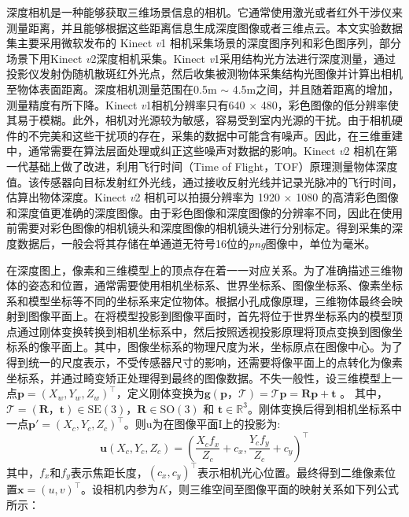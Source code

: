 深度相机是一种能够获取三维场景信息的相机。它通常使用激光或者红外干涉仪来测量距离，并且能够根据这些距离信息生成深度图像或者三维点云。本文实验数据集主要采用微软发布的 Kinect \emph{v}1 相机采集场景的深度图序列和彩色图序列，部分场景下用Kinect \emph{v}2深度相机采集。Kinect \emph{v}1采用结构光方法进行深度测量，通过投影仪发射伪随机散斑红外光点，然后收集被测物体采集结构光图像并计算出相机至物体表面距离。深度相机测量范围在0.5m $\sim$ 4.5m之间，并且随着距离的增加，测量精度有所下降。Kinect \emph{v}1相机分辨率只有640 $\times$ 480，彩色图像的低分辨率使其易于模糊。此外，相机对光源较为敏感，容易受到室内光源的干扰。由于相机硬件的不完美和这些干扰项的存在，采集的数据中可能含有噪声。因此，在三维重建中，通常需要在算法层面处理或纠正这些噪声对数据的影响。Kinect \emph{v}2 相机在第一代基础上做了改进，利用飞行时间（Time of Flight，TOF）原理测量物体深度值。该传感器向目标发射红外光线，通过接收反射光线并记录光脉冲的飞行时间，估算出物体深度。Kinect \emph{v}2 相机可以拍摄分辨率为 1920 $\times$ 1080 的高清彩色图像和深度值更准确的深度图像。由于彩色图像和深度图像的分辨率不同，因此在使用前需要对彩色图像的相机镜头和深度图像的相机镜头进行分别标定。得到采集的深度数据后，一般会将其存储在单通道无符号16位的\emph{png}图像中，单位为毫米。\par 
在深度图上，像素和三维模型上的顶点存在着一一对应关系。为了准确描述三维物体的姿态和位置，通常需要使用相机坐标系、世界坐标系、图像坐标系、像素坐标系和模型坐标等不同的坐标系来定位物体。根据小孔成像原理，三维物体最终会映射到图像平面上。在将模型投影到图像平面时，首先将位于世界坐标系内的模型顶点通过刚体变换转换到相机坐标系中，然后按照透视投影原理将顶点变换到图像坐标系的像平面上。其中，图像坐标系的物理尺度为米，坐标原点在图像中心。为了得到统一的尺度表示，不受传感器尺寸的影响，还需要将像平面上的点转化为像素坐标系，并通过畸变矫正处理得到最终的图像数据。不失一般性，设三维模型上一点$\boldsymbol{p} = (X_w,Y_w,Z_w)^\top $，定义刚体变换为$\mathbf{g}\left(\boldsymbol{p}， \mathcal{T}\right)=\mathcal{T} \boldsymbol{p} = \boldsymbol{R} \boldsymbol{p}+\boldsymbol{t}$ 。
其中，$\mathcal{T}=\left(\boldsymbol{R}，\boldsymbol{t}\right) \in \mathrm{SE} (3)， \boldsymbol{R}   \in \mathrm{SO}(3) \text { 和 } \boldsymbol{t} \in \mathbb{R}^{3}$。刚体变换后得到相机坐标系中一点$\boldsymbol{p'}=(X_c,Y_c,Z_c)^\top$。则$\mathrm{u}$为在图像平面$\mathrm{I}$上的投影为:
\begin{equation}
 \mathbf{u}\left(X_c, Y_c, Z_c\right)=\left(\frac{X_{c} f_{x}}{Z_{c}}+c_{x}, \frac{Y_{c} f_{y}}{Z_{c}}+c_{y}\right)^{\top}
\end{equation}
其中，$f_x$和$f_y$表示焦距长度，$\left(c_{x}, c_{y}\right)^{\top}$表示相机光心位置。最终得到二维像素位置$\boldsymbol{x}=(u, v)^{\top}$。设相机内参为$K$，则三维空间至图像平面的映射关系如下列公式所示：
